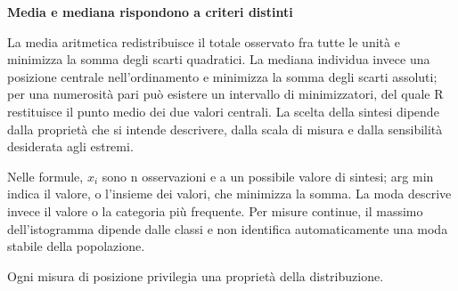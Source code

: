 \documentclass[12pt,aspectratio=1610]{beamer}
\begin{document}
\begin{lrbox}{\TitleBox}\begin{minipage}[t]{18.2cm}\raggedright\sloppy\color{Ink}\fontsize{20.7}{24}\selectfont \bfseries\color{Navy}Media e mediana rispondono a criteri distinti\end{minipage}\end{lrbox}
\begin{lrbox}{\BodyBox}\begin{minipage}[t]{10.25cm}\raggedright\sloppy\color{Ink}\fontsize{12.4}{16.4}\selectfont La media aritmetica redistribuisce il totale osservato fra tutte le unità e minimizza la somma degli scarti quadratici. La mediana individua invece una posizione centrale nell’ordinamento e minimizza la somma degli scarti assoluti; per una numerosità pari può esistere un intervallo di minimizzatori, del quale R restituisce il punto medio dei due valori centrali. La scelta della sintesi dipende dalla proprietà che si intende descrivere, dalla scala di misura e dalla sensibilità desiderata agli estremi.\par{}\end{minipage}\end{lrbox}
\begin{lrbox}{\SideBox}\begin{minipage}[t]{7.45cm}\raggedright\sloppy\color{Ink}\fontsize{12.2}{16.1}\selectfont Nelle formule, $x_i$ sono n osservazioni e a un possibile valore di sintesi; arg min indica il valore, o l’insieme dei valori, che minimizza la somma. La moda descrive invece il valore o la categoria più frequente. Per misure continue, il massimo dell’istogramma dipende dalle classi e non identifica automaticamente una moda stabile della popolazione.\end{minipage}\end{lrbox}
\begin{lrbox}{\RecallBox}\begin{minipage}[t]{16.45cm}\raggedright\sloppy\color{Ink}\fontsize{10.1}{13.2}\selectfont Ogni misura di posizione privilegia una proprietà della distribuzione.\end{minipage}\end{lrbox}
\end{document}
